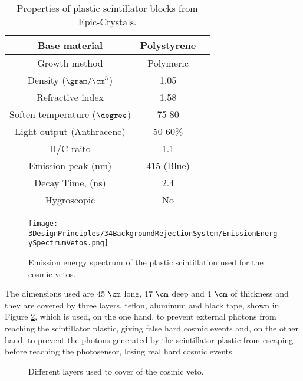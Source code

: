 \begin{table}[]
\begin{center}
\begin{tabular}{|c|c|c|}
\hline \hline 
Base material & Polystyrene \\ \hline
Growth method & Polymeric \\ \hline
Density ($\gram/\cm^3$)& 1.05 \\ \hline
Refractive index & 1.58 \\ \hline
Soften temperature ($\degree$) & 75-80 \\ \hline
Light output (Anthracene) & 50-60\% \\ \hline
H/C raito & 1.1 \\ \hline
Emission peak (nm) & 415 (Blue) \\ \hline
Decay Time, (ns) & 2.4 \\ \hline
Hygroscopic & No \\ \hline
\end{tabular}
\caption{Properties of plastic scintillator blocks from Epic-Crystals. \cite{ScintillatorVeto}}
\label{tab:ParametersScintillatorVeto}
\end{center}
\end{table}

\begin{figure}[]
\centering
\texttt{[image: 3DesignPrinciples/34BackgroundRejectionSystem/EmissionEnergySpectrumVetos.png]}
\caption{Emission energy spectrum of the plastic scintillation used for the cosmic vetos.\label{fig:EmissionEnergySpectrumVeto}~\cite{ScintillatorVeto}}
\end{figure}

The dimensions used are $45~\cm$ long, $17~\cm$ deep and $1~\cm$ of thickness and they are covered by three layers, teflon, aluminum and black tape, shown in Figure \ref{fig:LayersVeto}, which is used, on the one hand, to prevent external photons from reaching the scintillator plastic, giving false hard cosmic events and, on the other hand, to prevent the photons generated by the scintillator plastic from escaping before reaching the photosensor, losing real hard cosmic events.

\begin{figure}[h]
 \centering
 \caption{Different layers used to cover of the cosmic veto.}
 \label{fig:LayersVeto}
\end{figure}


